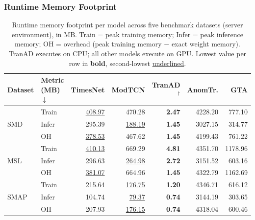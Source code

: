 \documentclass[twoside,11pt,openright]{report}
\begin{document}
\subsubsection{Runtime Memory Footprint}
\label{subsubsec:runtime_server}

\begin{table}[ht]
\centering
\caption{Runtime memory footprint per model across five benchmark datasets (server environment), in MB.
Train = peak training memory; Infer = peak inference memory;
OH = overhead (peak training memory $-$ exact weight memory).
TranAD executes on CPU; all other models execute on GPU. 
Lowest value per row in \textbf{bold}, second-lowest \underline{underlined}.}
\label{tab:memory_runtime_server}
\begin{tabular}{ll rrrrr}
\toprule
\textbf{Dataset} & \thead{\textbf{Metric}\\(MB) $\downarrow$}
    & \thead{\textbf{TimesNet}\\\citep{timesnet2023}}
    & \thead{\textbf{ModTCN}\\\citep{moderntcn2024}}
    & \thead{\textbf{TranAD}$^\dagger$\\\citep{tranad2022}}
    & \thead{\textbf{AnomTr.}\\\citep{anomalytransformer2022}}
    & \thead{\textbf{GTA}\\\citep{gta2022}} \\
\midrule
\multirow{3}{*}{SMD}
    & Train & \underline{408.97} & 470.28 &   \textbf{2.47} & 4228.20 &  777.10 \\
    & Infer & 295.39 & \underline{188.19} &   \textbf{1.45} & 3027.15 &  314.77 \\
    & OH    & \underline{378.53} & 467.62 &   \textbf{1.45} & 4199.43 &  761.22 \\
\midrule
\multirow{3}{*}{MSL}
    & Train & \underline{410.13} & 669.29 &   \textbf{4.81} & 4351.70 & 1178.96 \\
    & Infer & 296.63 & \underline{264.98} &   \textbf{2.72} & 3151.52 &  603.16 \\
    & OH    & \underline{381.07} & 664.96 &   \textbf{1.45} & 4322.79 & 1162.69 \\
\midrule
\multirow{3}{*}{SMAP}
    & Train & 215.64 & \underline{176.75} &   \textbf{1.20} & 4346.71 &  616.12 \\
    & Infer & 104.74 &  \underline{79.37} &   \textbf{0.74} & 3144.19 &  303.65 \\
    & OH    & 207.93 & \underline{176.15} &   \textbf{0.74} & 4318.04 &  600.46 \\

\end{tabular}
\end{table}
\end{document}
